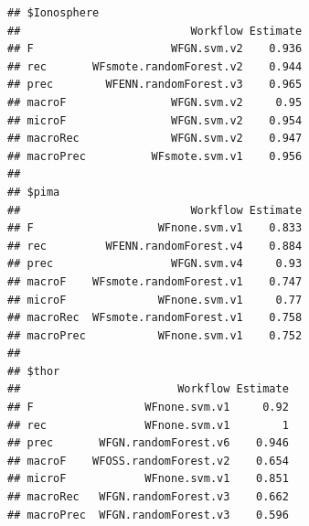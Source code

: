 \documentclass[10pt,a4paper]{article}\usepackage[]{graphicx}\usepackage[]{color}
\makeatletter
\newenvironment{kframe}{%
 \def\at@end@of@kframe{}%
 \ifinner\ifhmode%
  \def\at@end@of@kframe{\end{minipage}}%
  \begin{minipage}{\columnwidth}%
 \fi\fi%
 \def\FrameCommand##1{\hskip\@totalleftmargin \hskip-\fboxsep
 \colorbox{shadecolor}{##1}\hskip-\fboxsep
     \hskip-\linewidth \hskip-\@totalleftmargin \hskip\columnwidth}%
 \MakeFramed {\advance\hsize-\width
   \@totalleftmargin\z@ \linewidth\hsize
   \@setminipage}}%
 {\par\unskip\endMakeFramed%
 \at@end@of@kframe}
\newenvironment{knitrout}{}{} %
\makeatother
\begin{document}
\begin{knitrout}\footnotesize
{}\color{fgcolor}\begin{kframe}
\begin{verbatim}
## $Ionosphere
##                          Workflow Estimate
## F                     WFGN.svm.v2    0.936
## rec       WFsmote.randomForest.v2    0.944
## prec        WFENN.randomForest.v3    0.965
## macroF                WFGN.svm.v2     0.95
## microF                WFGN.svm.v2    0.954
## macroRec              WFGN.svm.v2    0.947
## macroPrec          WFsmote.svm.v1    0.956
## 
## $pima
##                          Workflow Estimate
## F                   WFnone.svm.v1    0.833
## rec         WFENN.randomForest.v4    0.884
## prec                  WFGN.svm.v4     0.93
## macroF    WFsmote.randomForest.v1    0.747
## microF              WFnone.svm.v1     0.77
## macroRec  WFsmote.randomForest.v1    0.758
## macroPrec           WFnone.svm.v1    0.752
## 
## $thor
##                        Workflow Estimate
## F                 WFnone.svm.v1     0.92
## rec               WFnone.svm.v1        1
## prec       WFGN.randomForest.v6    0.946
## macroF    WFOSS.randomForest.v2    0.654
## microF            WFnone.svm.v1    0.851
## macroRec   WFGN.randomForest.v3    0.662
## macroPrec  WFGN.randomForest.v3    0.596
\end{verbatim}
\end{kframe}
\end{knitrout}
\end{document}
